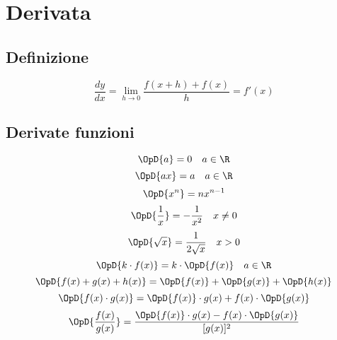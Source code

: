 \chapter{Derivata}
\section{Definizione}
\begin{equation*}
\dfrac{dy}{dx}=\lim_{h \to 0}\dfrac{f(x+h)+f(x)}{h}=f'(x)
\end{equation*}
\section{Derivate funzioni}
\begin{equation*}
\OpD{a}=0\quad a\in\R
\end{equation*}
\begin{equation*}
\OpD{ax}=a\quad a\in\R
\end{equation*}
\begin{equation*}
\OpD{x^n}=nx^{n-1}
\end{equation*}
\begin{equation*}
\OpD{\dfrac{1}{x}}=-\dfrac{1}{x^2}\quad x\neq 0
\end{equation*}
\begin{equation*}
\OpD{\sqrt{x}}=\dfrac{1}{2\sqrt{x}}\quad x> 0
\end{equation*}
\begin{equation*}
\OpD{k\cdot f( x )}=k\cdot\OpD{f(x)}\quad a\in\R
\end{equation*}
\begin{equation*}
\OpD{f( x )+g( x )+h( x )}=\OpD{f( x )}+\OpD{g( x )}+\OpD{h( x )}
\end{equation*}
\begin{equation*}
\OpD{f( x )\cdot g( x )}=\OpD{f( x )}\cdot g( x )+f( x )\cdot\OpD{g( x )}
\end{equation*}
\begin{equation*}
\OpD{\dfrac{f( x )}{g( x )}}=\dfrac{\OpD{f( x )}\cdot g( x )-f( x )\cdot\OpD{g( x )}} {[g( x )]^2}
\end{equation*}